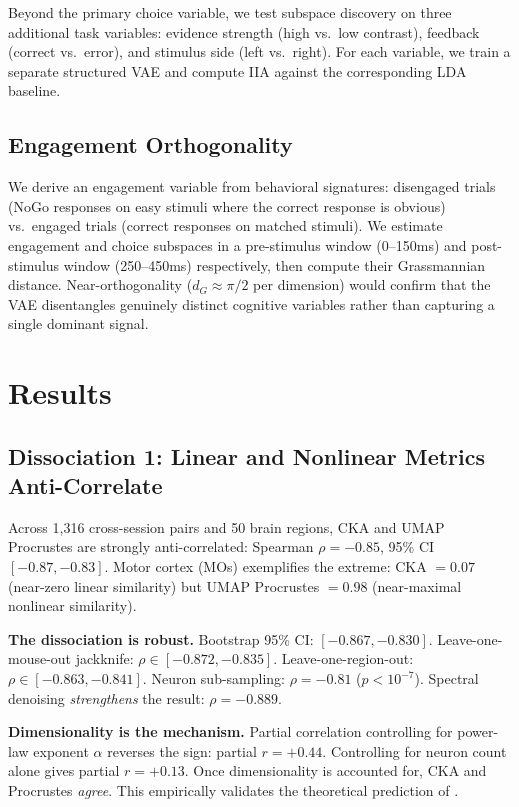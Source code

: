 \documentclass{article}
\begin{document}
Beyond the primary choice variable, we test subspace discovery on three additional task variables: evidence strength (high vs.\ low contrast), feedback (correct vs.\ error), and stimulus side (left vs.\ right). For each variable, we train a separate structured VAE and compute IIA against the corresponding LDA baseline.

\subsection{Engagement Orthogonality}

We derive an engagement variable from behavioral signatures: disengaged trials (NoGo responses on easy stimuli where the correct response is obvious) vs.\ engaged trials (correct responses on matched stimuli). We estimate engagement and choice subspaces in a pre-stimulus window (0--150ms) and post-stimulus window (250--450ms) respectively, then compute their Grassmannian distance. Near-orthogonality ($d_G \approx \pi/2$ per dimension) would confirm that the VAE disentangles genuinely distinct cognitive variables rather than capturing a single dominant signal.

\section{Results}

\subsection{Dissociation 1: Linear and Nonlinear Metrics Anti-Correlate}

Across 1,316 cross-session pairs and 50 brain regions, CKA and UMAP Procrustes are strongly anti-correlated: Spearman $\rho = -0.85$, 95\% CI $[-0.87, -0.83]$. Motor cortex (MOs) exemplifies the extreme: CKA $= 0.07$ (near-zero linear similarity) but UMAP Procrustes $= 0.98$ (near-maximal nonlinear similarity).

\textbf{The dissociation is robust.} Bootstrap 95\% CI: $[-0.867, -0.830]$. Leave-one-mouse-out jackknife: $\rho \in [-0.872, -0.835]$. Leave-one-region-out: $\rho \in [-0.863, -0.841]$. Neuron sub-sampling: $\rho = -0.81$ ($p < 10^{-7}$). Spectral denoising \citep{spectral2025neurips} \emph{strengthens} the result: $\rho = -0.889$.

\textbf{Dimensionality is the mechanism.} Partial correlation controlling for power-law exponent $\alpha$ reverses the sign: partial $r = +0.44$. Controlling for neuron count alone gives partial $r = +0.13$. Once dimensionality is accounted for, CKA and Procrustes \emph{agree}. This empirically validates the theoretical prediction of \citet{harvey2024representational}.
\end{document}
